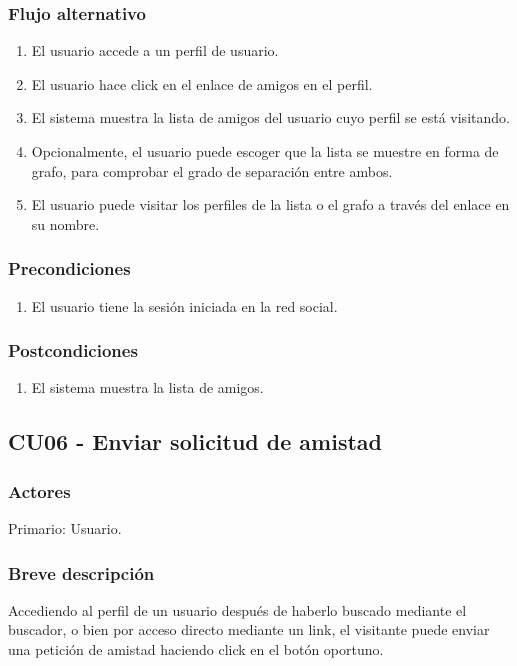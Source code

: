 \documentclass[12pt, a4paper, titlepage]{article}
\begin{document}
\subsubsection{Flujo alternativo}
\begin{enumerate}
	\item El usuario accede a un perfil de usuario.
	\item El usuario hace click en el enlace de amigos en el perfil.
	\item El sistema muestra la lista de amigos del usuario cuyo perfil se está visitando.
	\item Opcionalmente, el usuario puede escoger que la lista se muestre en forma de grafo, para comprobar el grado de separación entre ambos.
	\item El usuario puede visitar los perfiles de la lista o el grafo a través del enlace en su nombre.
\end{enumerate}
\subsubsection{Precondiciones}
\begin{enumerate}
	\item El usuario tiene la sesión iniciada en la red social.
\end{enumerate}
\subsubsection{Postcondiciones}
\begin{enumerate}
	\item El sistema muestra la lista de amigos.
\end{enumerate}



\subsection{CU06 - Enviar solicitud de amistad}
\subsubsection{Actores}
Primario: Usuario.
\subsubsection{Breve descripción}
 Accediendo al perfil de un usuario después de haberlo buscado mediante el buscador, o bien por acceso directo mediante un link, el visitante puede enviar una petición de amistad haciendo click en el botón oportuno.
\end{document}
